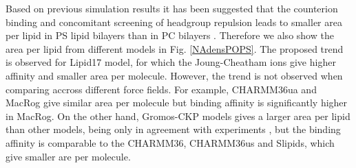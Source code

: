 \documentclass[aps,prl,superscriptaddress,twocolumn]{revtex4}
\begin{document}
Based on previous simulation results it has been suggested that
the counterion binding and concomitant screening of headgroup repulsion
leads to smaller area per lipid in PS lipid bilayers than in PC
bilayers \cite{pandit02,mukhopadhyay04,pedersen06}. Therefore we also show the area per lipid from different models
in Fig. \ref{NAdensPOPS}. The proposed trend is observed for Lipid17 model,
for which the Joung-Cheatham ions give higher affinity and smaller area
per molecule. However, the trend is not observed when comparing accross different
force fields. For example, CHARMM36ua and MacRog give similar area per molecule
but binding affinity is significantly higher in MacRog. On the other hand,
Gromos-CKP models gives a larger area per lipid than other models, being only
in agreement with experiments \cite{pan14}, but the binding affinity is comparable
to the CHARMM36, CHARMM36us and Slipids, which give smaller are per molecule.
\end{document}
